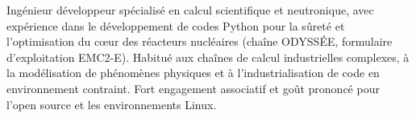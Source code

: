 \documentclass{modernsimplecv}
\begin{document}
\begin{minipage}[t]{0.77\textwidth}
\begin{tcolorbox}[boxsep=1mm, boxrule=0.1mm, colframe=green,colback=green]
\begin{minipage}[t]{0.55\textwidth}
		\end{minipage}
	\end{tcolorbox}
    \begin{tcolorbox}[boxsep=-1mm, boxrule=0mm,colframe=shadecolor,colback=shadecolor]

      \footnotesize
      Ingénieur développeur spécialisé en calcul scientifique et neutronique, avec expérience dans le développement de codes Python pour la sûreté et l’optimisation du cœur des réacteurs nucléaires (chaîne ODYSSÉE, formulaire d’exploitation EMC2-E). Habitué aux chaînes de calcul industrielles complexes, à la modélisation de phénomènes physiques et à l’industrialisation de code en environnement contraint. Fort engagement associatif et goût prononcé pour l’open source et les environnements Linux.
    \end{tcolorbox}
\end{minipage}\\[15pt]



\subsection*{}
\vspace{-5em}
\end{document}
